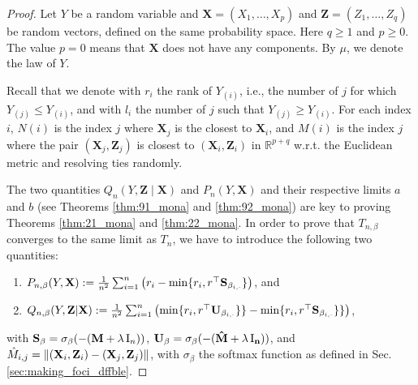 \begin{proof}
    Let $Y$ be a random variable and $\mathbf{X}=\left(X_1, \ldots, X_p\right)$ and $\mathbf{Z}=\left(Z_1, \ldots, Z_q\right)$ be random vectors, defined on the same probability space. Here $q \geq 1$ and $p \geq 0$. The value $p=0$ means that $\mathbf{X}$ does not have any components. By $\mu$, we denote the law of $Y$. 
    
    Recall that we denote with $r_i$ the rank of $Y_{(i)}$, i.e., the number of $j$ for which $Y_{(j)} \leq Y_{(i)}$, and with $l_i$ the number of $j$ such that $Y_{(j)} \geq Y_{(i)}$. For each index $i$, $N(i)$ is the index $j$ where $\mathbf{X}_j$ is the closest to $\mathbf{X}_i$, and $M(i)$ is the index $j$ where the pair $(\mathbf{X}_j, \mathbf{Z}_j)$ is closest to $(\mathbf{X}_i, \mathbf{Z}_i)$ in $\mathbb{R}^{p+q}$ w.r.t. the Euclidean metric and resolving ties randomly.  
    
    The two quantities $Q_n(Y, \mathbf{Z} \mid \mathbf{X})$ and $P_n(Y, \mathbf{X})$ and their respective limits $a$ and $b$ (see Theorems \ref{thm:91_mona} and \ref{thm:92_mona}) are key to proving Theorems \ref{thm:21_mona} and \ref{thm:22_mona}. In order to prove that $T_{n,\beta}$ converges to the same limit as $T_n$, we have to introduce the following two quantities:

    \begin{enumerate}
        \item $P_{n,\beta}(Y, \mathbf{X}) := \frac{1}{n^2} \sum_{i=1}^n \left(r_i - \min\{r_i, r^\top{\bf{S}}_{{\beta}_{ i, \cdot}}\}\right)$, and 
        \item $Q_{n,\beta}(Y, \mathbf{Z} |\mathbf{X}) := \frac{1}{n^2} \sum_{i=1}^n \left(\min\{r_i, r^\top{\bf{U}}_{{\beta}_{i, \cdot}}\}\} - \min\{r_i, r^\top{\bf{S}}_{{\beta}_{i, \cdot}}\}\}\right)$, 
    \end{enumerate}
    with ${\bf{S}}_{\beta}=\sigma_\beta(-({\bf{M}}+\lambda\operatorname{I}_n))$, ${\bf{U}}_{\beta}=\sigma_\beta(-(\bf{\hat{M}}+\lambda\operatorname{I}_n))$, and $\hat{M}_{i,j}=\|(\mathbf{X}_i, \mathbf{Z}_i)-(\mathbf{X}_j, \mathbf{Z}_j)\|$, with $\sigma_\beta$ the softmax function as defined in Sec. \ref{sec:making_foci_dffble}.


\end{proof}

